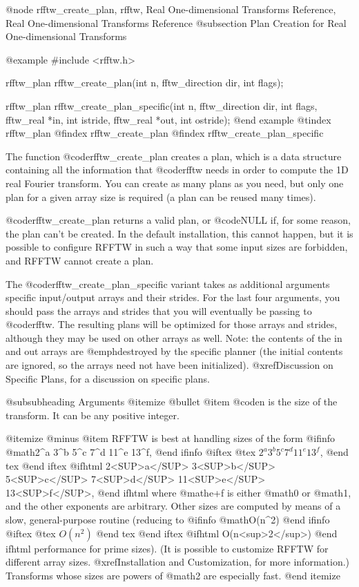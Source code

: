 @node    rfftw_create_plan, rfftw, Real One-dimensional Transforms Reference, Real One-dimensional Transforms Reference
@subsection Plan Creation for Real One-dimensional Transforms

@example
#include <rfftw.h>

rfftw_plan rfftw_create_plan(int n, fftw_direction dir, int flags);

rfftw_plan rfftw_create_plan_specific(int n, fftw_direction dir,
	    int flags, fftw_real *in, int istride,
	    fftw_real *out, int ostride);
@end example
@tindex rfftw_plan
@findex rfftw_create_plan
@findex rfftw_create_plan_specific

The function @code{rfftw_create_plan} creates a plan, which is a data
structure containing all the information that @code{rfftw} needs in
order to compute the 1D real Fourier transform. You can create as many
plans as you need, but only one plan for a given array size is required
(a plan can be reused many times).

@code{rfftw_create_plan} returns a valid plan, or @code{NULL} if, for
some reason, the plan can't be created.  In the default installation,
this cannot happen, but it is possible to configure RFFTW in such a way
that some input sizes are forbidden, and RFFTW cannot create a plan.

The @code{rfftw_create_plan_specific} variant takes as additional
arguments specific input/output arrays and their strides.  For the last
four arguments, you should pass the arrays and strides that you will
eventually be passing to @code{rfftw}.  The resulting plans will be
optimized for those arrays and strides, although they may be used on
other arrays as well.  Note: the contents of the in and out arrays are
@emph{destroyed} by the specific planner (the initial contents are
ignored, so the arrays need not have been initialized).
@xref{Discussion on Specific Plans}, for a discussion on specific plans.

@subsubheading Arguments
@itemize @bullet
@item
@code{n} is the size of the transform.  It can be
 any positive integer.
 
@itemize @minus
@item
RFFTW is best at handling sizes of the form
@ifinfo
@math{2^a 3^b 5^c 7^d 11^e 13^f},
@end ifinfo
@iftex
@tex
$2^a 3^b 5^c 7^d 11^e 13^f$,
@end tex
@end iftex
@ifhtml
2<SUP>a</SUP> 3<SUP>b</SUP> 5<SUP>c</SUP> 7<SUP>d</SUP>
        11<SUP>e</SUP> 13<SUP>f</SUP>,
@end ifhtml
where @math{e+f} is either @math{0} or
@math{1}, and the other exponents are arbitrary.  Other sizes are
computed by means of a slow, general-purpose routine (reducing to
@ifinfo
@math{O(n^2)}
@end ifinfo
@iftex
@tex
$O(n^2)$
@end tex
@end iftex
@ifhtml
O(n<sup>2</sup>)
@end ifhtml
performance for prime sizes).  (It is possible to customize RFFTW for
different array sizes.  @xref{Installation and Customization}, for more
information.)  Transforms whose sizes are powers of @math{2} are
especially fast.
@end itemize

